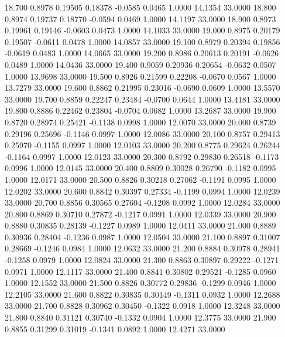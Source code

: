   18.700   0.8978   0.19505   0.18378  -0.0585   0.0465   1.0000  14.1354  33.0000
  18.800   0.8974   0.19737   0.18770  -0.0594   0.0469   1.0000  14.1197  33.0000
  18.900   0.8973   0.19961   0.19146  -0.0603   0.0473   1.0000  14.1033  33.0000
  19.000   0.8975   0.20179   0.19507  -0.0611   0.0478   1.0000  14.0857  33.0000
  19.100   0.8979   0.20394   0.19856  -0.0619   0.0483   1.0000  14.0665  33.0000
  19.200   0.8986   0.20613   0.20191  -0.0626   0.0489   1.0000  14.0436  33.0000
  19.400   0.9059   0.20936   0.20654  -0.0632   0.0507   1.0000  13.9698  33.0000
  19.500   0.8926   0.21599   0.22208  -0.0670   0.0567   1.0000  13.7279  33.0000
  19.600   0.8862   0.21995   0.23016  -0.0690   0.0609   1.0000  13.5570  33.0000
  19.700   0.8859   0.22247   0.23484  -0.0700   0.0644   1.0000  13.4181  33.0000
  19.800   0.8886   0.22462   0.23804  -0.0704   0.0682   1.0000  13.2687  33.0000
  19.900   0.8720   0.28974   0.25421  -0.1138   0.0998   1.0000  12.0070  33.0000
  20.000   0.8739   0.29196   0.25696  -0.1146   0.0997   1.0000  12.0086  33.0000
  20.100   0.8757   0.29413   0.25970  -0.1155   0.0997   1.0000  12.0103  33.0000
  20.200   0.8775   0.29624   0.26244  -0.1164   0.0997   1.0000  12.0123  33.0000
  20.300   0.8792   0.29830   0.26518  -0.1173   0.0996   1.0000  12.0145  33.0000
  20.400   0.8809   0.30028   0.26790  -0.1182   0.0995   1.0000  12.0171  33.0000
  20.500   0.8826   0.30218   0.27062  -0.1191   0.0995   1.0000  12.0202  33.0000
  20.600   0.8842   0.30397   0.27334  -0.1199   0.0994   1.0000  12.0239  33.0000
  20.700   0.8856   0.30565   0.27604  -0.1208   0.0992   1.0000  12.0284  33.0000
  20.800   0.8869   0.30710   0.27872  -0.1217   0.0991   1.0000  12.0339  33.0000
  20.900   0.8880   0.30835   0.28139  -0.1227   0.0989   1.0000  12.0411  33.0000
  21.000   0.8889   0.30936   0.28404  -0.1236   0.0987   1.0000  12.0504  33.0000
  21.100   0.8897   0.31007   0.28669  -0.1246   0.0984   1.0000  12.0632  33.0000
  21.200   0.8884   0.30978   0.28941  -0.1258   0.0979   1.0000  12.0824  33.0000
  21.300   0.8863   0.30897   0.29222  -0.1271   0.0971   1.0000  12.1117  33.0000
  21.400   0.8841   0.30802   0.29521  -0.1285   0.0960   1.0000  12.1552  33.0000
  21.500   0.8826   0.30772   0.29836  -0.1299   0.0946   1.0000  12.2105  33.0000
  21.600   0.8822   0.30835   0.30149  -0.1311   0.0932   1.0000  12.2688  33.0000
  21.700   0.8828   0.30962   0.30450  -0.1322   0.0918   1.0000  12.3248  33.0000
  21.800   0.8840   0.31121   0.30740  -0.1332   0.0904   1.0000  12.3775  33.0000
  21.900   0.8855   0.31299   0.31019  -0.1341   0.0892   1.0000  12.4271  33.0000
